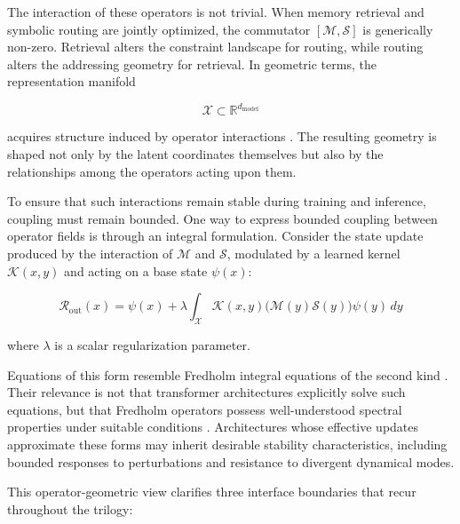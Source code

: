 The interaction of these operators is not trivial. When memory retrieval and symbolic routing are jointly optimized, the commutator $[\mathcal{M},\mathcal{S}]$ is generically non-zero. Retrieval alters the constraint landscape for routing, while routing alters the addressing geometry for retrieval. In geometric terms, the representation manifold

\begin{equation}
\mathcal{X} \subset \mathbb{R}^{d_{\mathrm{model}}}
\end{equation}

acquires structure induced by operator interactions \cite{bronstein2021geometric}. The resulting geometry is shaped not only by the latent coordinates themselves but also by the relationships among the operators acting upon them.

To ensure that such interactions remain stable during training and inference, coupling must remain bounded. One way to express bounded coupling between operator fields is through an integral formulation. Consider the state update produced by the interaction of $\mathcal{M}$ and $\mathcal{S}$, modulated by a learned kernel $\mathcal{K}(x,y)$ and acting on a base state $\psi(x)$:

\begin{equation}
\mathcal{R}_{\text{out}}(x) = \psi(x) + \lambda \int_{\mathcal{X}} \mathcal{K}(x,y) \bigl( \mathcal{M}(y) \mathcal{S}(y) \bigr) \psi(y) \, dy
\label{eq:operator_coupling}
\end{equation}

where $\lambda$ is a scalar regularization parameter.

Equations of this form resemble Fredholm integral equations of the second kind \cite{lax2002functional}. Their relevance is not that transformer architectures explicitly solve such equations, but that Fredholm operators possess well-understood spectral properties under suitable conditions \cite{reed1980methods}. Architectures whose effective updates approximate these forms may inherit desirable stability characteristics, including bounded responses to perturbations and resistance to divergent dynamical modes.

This operator-geometric view clarifies three interface boundaries that recur throughout the trilogy:

